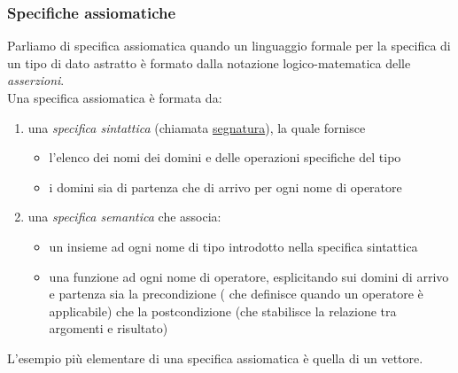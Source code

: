 \documentclass{article}
\begin{document}
	\subsubsection{Specifiche assiomatiche}
	Parliamo di specifica assiomatica quando un linguaggio formale per la specifica di un tipo di dato astratto è formato dalla notazione logico-matematica delle \textit{asserzioni}. \\
	Una specifica assiomatica è formata da:
	\begin{enumerate}
		\item una \textit{specifica sintattica} (chiamata \underline{segnatura}), la quale fornisce 
			\begin{itemize}
				\item l'elenco dei nomi dei domini e delle operazioni specifiche del tipo
				\item i domini sia di partenza che di arrivo per ogni nome di operatore
		\end{itemize}
		\item una \textit{specifica semantica} che associa:
			\begin{itemize}
				\item un insieme ad ogni nome di tipo introdotto nella specifica sintattica
				\item una funzione ad ogni nome di operatore, esplicitando sui domini di arrivo e partenza sia la precondizione ( che definisce quando un operatore è applicabile) che la postcondizione (che stabilisce la relazione tra argomenti e risultato)
			\end{itemize}
	\end{enumerate}
	L'esempio più elementare di una specifica assiomatica è quella di un vettore.
	
\end{document}
